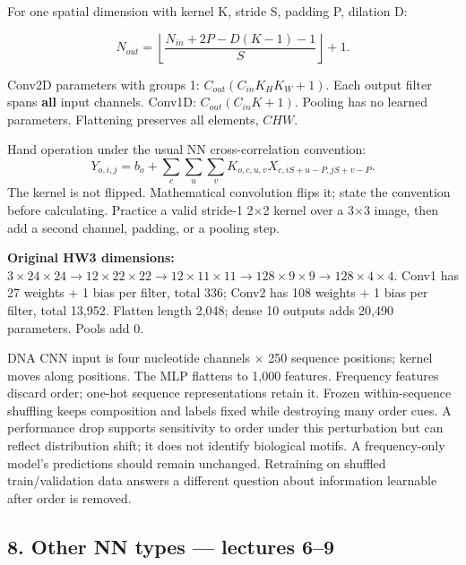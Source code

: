 \documentclass[11pt]{article}
\begin{document}
For one spatial dimension with kernel K, stride S, padding P, dilation D:

\[
N_{out}=\left\lfloor\frac{N_{in}+2P-D(K-1)-1}{S}\right\rfloor+1.
\]

Conv2D parameters with groups 1: $C_{out}(C_{in}K_HK_W+1)$. Each output filter spans \textbf{all} input channels. Conv1D: $C_{out}(C_{in}K+1)$. Pooling has no learned parameters. Flattening preserves all elements, $C H W$.

Hand operation under the usual NN cross-correlation convention:
\[
Y_{o,i,j}=b_o+\sum_c\sum_u\sum_v K_{o,c,u,v}X_{c,iS+u-P,jS+v-P}.
\]
The kernel is not flipped. Mathematical convolution flips it; state the convention before calculating. Practice a valid stride-1 2\ensuremath{\times}2 kernel over a 3\ensuremath{\times}3 image, then add a second channel, padding, or a pooling step.

\textbf{Original HW3 dimensions:} $3\times 24\times 24\to12\times 22\times 22\to12\times 11\times 11\to128\times 9\times 9\to128\times 4\times 4$. Conv1 has 27 weights + 1 bias per filter, total 336; Conv2 has 108 weights + 1 bias per filter, total 13,952. Flatten length 2,048; dense 10 outputs adds 20,490 parameters. Pools add 0.

DNA CNN input is four nucleotide channels \ensuremath{\times} 250 sequence positions; kernel moves along positions. The MLP flattens to 1,000 features. Frequency features discard order; one-hot sequence representations retain it. Frozen within-sequence shuffling keeps composition and labels fixed while destroying many order cues. A performance drop supports sensitivity to order under this perturbation but can reflect distribution shift; it does not identify biological motifs. A frequency-only model's predictions should remain unchanged. Retraining on shuffled train/\allowbreak{}validation data answers a different question about information learnable after order is removed.

\subsection*{8. Other NN types — lectures 6–9}
\end{document}
